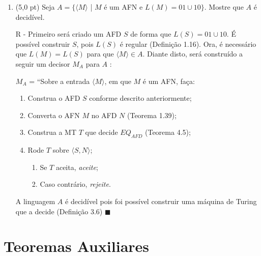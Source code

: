 \documentclass[12pt,a4paper,oneside]{article}
\begin{document}
\begin{enumerate}
	\newpage
	
	\item (5,0 pt) Seja $A = \{\langle M \rangle$ | $M$ é um AFN e $L(M) = 01 \cup 10 \}$. Mostre que $A$ é decidível.
	
	\vspace{0.3cm}
	
	{\color{verde}
		R - Primeiro será criado um AFD $S$ de forma que $L(S) = 01 \cup 10$. É possível construir $S$, pois $L(S)$ é regular (Definição 1.16). Ora, é necessário que $L(M) =  L(S)$ para que $\langle M \rangle \in A$. 	Diante disto, será construído a seguir um decisor $M_A$ para $A$ :
		
		$M_A$ = ``Sobre a entrada $\langle M \rangle$, em que $M$ é um AFN, faça:
			\begin{enumerate}
				\item Construa o AFD $S$ conforme descrito anteriormente;
				\item Converta o AFN $M$ no AFD $N$ (Teorema 1.39);
				\item Construa a MT $T$ que decide $EQ_{AFD}$ (Teorema 4.5);
				\item Rode $T$ sobre $\langle S, N \rangle$;
				\begin{enumerate}
					\item Se $T$ aceita, {\it aceite};
					\item Caso contrário, {\it rejeite}.
				\end{enumerate}					
			\end{enumerate}
		
		A linguagem $A$ é decidível pois foi possível construir uma máquina de Turing que a decide (Definição 3.6) $\blacksquare$
		
	}
	
\end{enumerate}

\section*{Teoremas Auxiliares}
\end{document}
